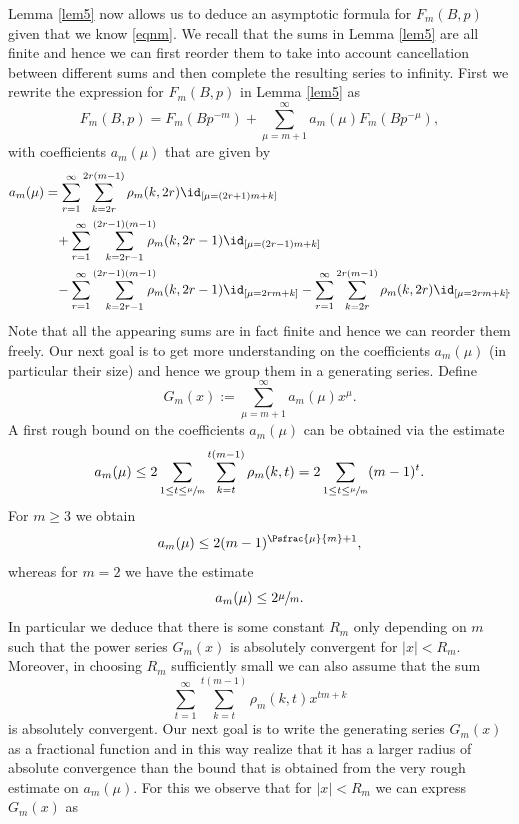Lemma \ref{lem5} now allows us to deduce an asymptotic formula for $F_m(B,p)$ given that we know \eqref{eqnm}. We recall that the sums in Lemma \ref{lem5} are all finite and hence we can first reorder them to take into account cancellation between different sums and then complete the resulting series to infinity. First we rewrite the expression for $F_m(B,p)$ in Lemma \ref{lem5} as
\begin{equation}\label{eqn25}
F_m(B,p) = F_m(Bp^{-m}) +\sum_{\mu=m+1}^\infty a_m(\mu) F_m(Bp^{-\mu}),
\end{equation}
with coefficients $a_m(\mu)$ that are given by
\begin{equation*}
\begin{split}
a_m(\mu)&=\sum_{r=1}^{\infty} \sum_{k=2r}^{2r(m-1)}\rho_m(k,2r)\id_{[\mu=(2r+1)m+k]}\\
&\hspace*{3mm}+ \sum_{r=1}^\infty\sum_{k=2r-1}^{(2r-1)(m-1)}\hspace*{-3mm}\rho_m(k,2r-1)\id_{[\mu=(2r-1)m+k]}\\
&\hspace*{3mm}-\sum_{r=1}^\infty \sum_{k=2r-1}^{(2r-1)(m-1)}\hspace*{-3mm}\rho_m(k,2r-1)\id_{[\mu=2rm+k]}-\sum_{r=1}^\infty\sum_{k=2r}^{2r(m-1)}\rho_m(k,2r)\id_{[\mu=2rm+k]}\!.
\end{split}
\end{equation*}
Note that all the appearing sums are in fact finite and hence we can reorder them freely. Our next goal is to get more understanding on the coefficients $a_m(\mu)$ (in particular their size) and hence we group them in a generating series. Define
\[
G_m(x):=\sum_{\mu=m+1}^\infty a_m(\mu) x^\mu.
\]
A first rough bound on the coefficients $a_m(\mu)$ can be obtained via the estimate
\[
a_m(\mu)\leq 2\sum_{1\leq t\leq \sfrac{\mu}{m}} \sum_{k=t}^{t(m-1)}\rho_m(k,t)= 2 \sum_{1\leq t\leq \sfrac{\mu}{m}} (m-1)^t .
\]
For $m\geq 3$ we obtain
\[
a_m(\mu)\leq 2(m-1)^{\Psfrac{\mu}{m}+1},
\]
whereas for $m=2$ we have the estimate
\[
a_m(\mu)\leq 2 \sfrac{\mu}{m}.
\]
In particular we deduce that there is some constant $R_m$ only depending on $m$ such that the power series $G_m(x)$ is absolutely convergent for $|x|<R_m$. Moreover, in choosing $R_m$ sufficiently small we can also assume that the sum
\[
\sum_{t=1}^{\infty} \sum_{k=t}^{t(m-1)}\rho_m(k,t)x^{tm+k}
\]
is absolutely convergent. Our next goal is to write the generating series $G_m(x)$ as a fractional function and in this way realize that it has a larger radius of absolute convergence than the bound that is obtained from the very rough estimate on $a_m(\mu)$. For this we observe that for $|x|<R_m$ we can express $G_m(x)$ as
